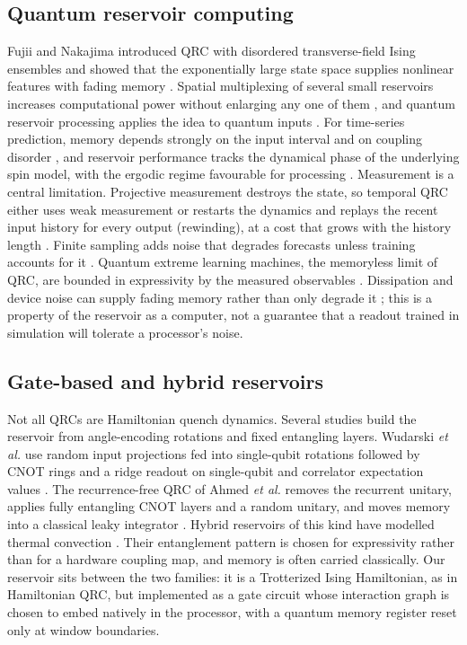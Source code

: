 \documentclass[journal]{IEEEtran}
\begin{document}
\subsection{Quantum reservoir computing}
Fujii and Nakajima introduced QRC with disordered transverse-field Ising ensembles and showed that the exponentially large state space supplies nonlinear features with fading memory \cite{Fujii2017QRC}. Spatial multiplexing of several small reservoirs increases computational power without enlarging any one of them \cite{Nakajima2019Multiplexing}, and quantum reservoir processing applies the idea to quantum inputs \cite{Ghosh2019Processing}. For time-series prediction, memory depends strongly on the input interval and on coupling disorder \cite{Kutvonen2020Optimizing}, and reservoir performance tracks the dynamical phase of the underlying spin model, with the ergodic regime favourable for processing \cite{MartinezPena2021Phase}. Measurement is a central limitation. Projective measurement destroys the state, so temporal QRC either uses weak measurement or restarts the dynamics and replays the recent input history for every output (rewinding), at a cost that grows with the history length \cite{Mujal2023Measurements}. Finite sampling adds noise that degrades forecasts unless training accounts for it \cite{Ahmed2025FiniteSampling}. Quantum extreme learning machines, the memoryless limit of QRC, are bounded in expressivity by the measured observables \cite{Innocenti2023QELM}. Dissipation and device noise can supply fading memory rather than only degrade it \cite{Suzuki2022Natural,Kubota2023Noise,Sannia2024Dissipation,Ricci2026Damping}; this is a property of the reservoir as a computer, not a guarantee that a readout trained in simulation will tolerate a processor's noise.

\subsection{Gate-based and hybrid reservoirs}
Not all QRCs are Hamiltonian quench dynamics. Several studies build the reservoir from angle-encoding rotations and fixed entangling layers. Wudarski \emph{et al.} use random input projections fed into single-qubit rotations followed by CNOT rings and a ridge readout on single-qubit and correlator expectation values \cite{Wudarski2023Hybrid}. The recurrence-free QRC of Ahmed \emph{et al.} removes the recurrent unitary, applies fully entangling CNOT layers and a random unitary, and moves memory into a classical leaky integrator \cite{Ahmed2024RecurrenceFree}. Hybrid reservoirs of this kind have modelled thermal convection \cite{Pfeffer2022Convection}. Their entanglement pattern is chosen for expressivity rather than for a hardware coupling map, and memory is often carried classically. Our reservoir sits between the two families: it is a Trotterized Ising Hamiltonian, as in Hamiltonian QRC, but implemented as a gate circuit whose interaction graph is chosen to embed natively in the processor, with a quantum memory register reset only at window boundaries.
\end{document}
